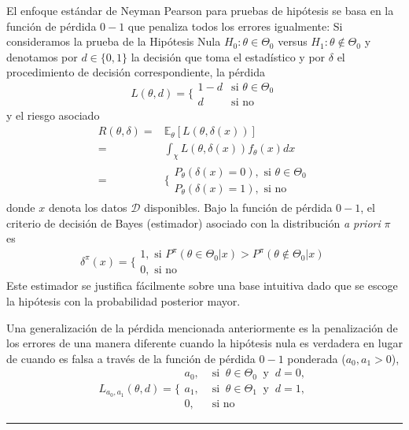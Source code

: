 \documentclass[12pt,]{article}
\begin{document}
El enfoque estándar de Neyman Pearson para pruebas de hipótesis se basa
en la función de pérdida \(0-1\) que penaliza todos los errores
igualmente: Si consideramos la prueba de la Hipótesis Nula
\(H_0: \theta\in\Theta_0\) versus \(H_1: \theta\notin\Theta_0\) y
denotamos por \(d\in\{0,1\}\) la decisión que toma el estadístico y por
\(\delta\) el procedimiento de decisión correspondiente, la pérdida \[
L(\theta,d)=\Bigg\{
\begin{array}{ll}
1-d &\text{si } \theta\in\Theta_0\\
d &\text{si no}
\end{array}
\] y el riesgo asociado \[
\begin{array}{rl}
R(\theta,\delta) = & \mathbb{E}_\theta[L(\theta,\delta(x))]\\
= & \displaystyle\int_\chi L(\theta,\delta(x))f_\theta(x)dx\\
= & \bigg\{
\displaystyle\begin{array}{lr}
P_\theta(\delta(x)=0), \text{ si }\theta\in\Theta_0\\
P_\theta(\delta(x)=1), \text{ si no}
\end{array}
\end{array}
\] donde \(x\) denota los datos \(\mathcal{D}\) disponibles. Bajo la
función de pérdida \(0-1\), el criterio de decisión de Bayes (estimador)
asociado con la distribución \emph{a priori} \(\pi\) es \[
\delta^\pi(x)=\Bigg\{
\begin{array}{lr}
1, \text{ si }P^\pi(\theta\in\Theta_0|x)>P^\pi(\theta\notin\Theta_0|x)\\
0, \text{ si no}
\end{array}
\] Este estimador se justifica fácilmente sobre una base intuitiva dado
que se escoge la hipótesis con la probabilidad posterior mayor.

Una generalización de la pérdida mencionada anteriormente es la
penalización de los errores de una manera diferente cuando la hipótesis
nula es verdadera en lugar de cuando es falsa a través de la función de
pérdida \(0-1\) ponderada (\(a_0,a_1>0\)), \[
L_{a_0,a_1}(\theta,d)= \Bigg \{
\begin{array}{ll}
a_0, &\text{ si }\ \theta\in\Theta_0\ \text{ y }\ d=0,\\
a_1, &\text{ si }\ \theta\in\Theta_1\ \text{ y }\ d=1,\\
0,&\text{ si no }
\end{array}
\]

\begin{center}\rule{0.5\linewidth}{\linethickness}\end{center}
\end{document}
